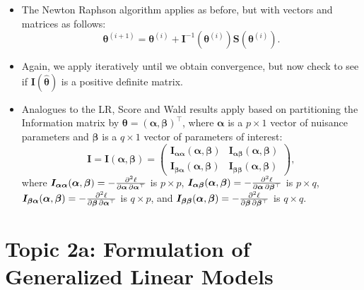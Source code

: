 \documentclass{article}\usepackage[]{graphicx}\usepackage[svgnames]{xcolor}
\providecommand{\Vector}[1]{\bm{#1}}%
\providecommand{\Matrix}[1]{\bm{#1}}
\begin{document}
\begin{itemize}
      \item The Newton Raphson algorithm applies as before, but with vectors and matrices
            as follows:
            \[ \Vector{\theta}^{(i+1)}=\Vector{\theta}^{(i)}+\Matrix{I}^{-1}(\Vector{\theta}^{(i)})\Vector{S}(\Vector{\theta}^{(i)}). \]
      \item Again, we apply iteratively until we obtain convergence, but now check to
            see if $ \Matrix{I}(\hat{\Vector{\theta}}) $ is a positive definite matrix.
      \item Analogues to the LR, Score and Wald results apply based on partitioning the
            Information matrix by $ \Vector{\theta}=(\Vector{\alpha},\Vector{\beta})^\top $,
            where $ \Vector{\alpha} $ is a $ p\times 1 $ vector of nuisance parameters and $ \Vector{\beta} $ is a $ q\times 1 $ vector of parameters of interest:
            \[ \Matrix{I}=\Matrix{I}(\Vector{\alpha},\Vector{\beta})=\begin{pmatrix}
                        \Matrix{I}_{\Vector{\alpha}\Vector{\alpha}}(\Vector{\alpha},\Vector{\beta}) & \Matrix{I}_{\Vector{\alpha}\Vector{\beta}}(\Vector{\alpha},\Vector{\beta}) \\
                        \Matrix{I}_{\Vector{\beta}\Vector{\alpha}}(\Vector{\alpha},\Vector{\beta})  & \Matrix{I}_{\Vector{\beta}\Vector{\beta}}(\Vector{\alpha},\Vector{\beta})
                  \end{pmatrix}, \]
            where
            $ \Matrix{I}_{\Vector{\alpha}\Vector{\alpha}}(\Vector{\alpha},\Vector{\beta})=-\pdv{\ell}{\Vector{\alpha},\Vector{\alpha}^\top} $ is $ p\times p $,
            $ \Matrix{I}_{\Vector{\alpha}\Vector{\beta}}(\Vector{\alpha},\Vector{\beta})=-\pdv{\ell}{\Vector{\alpha},\Vector{\beta}^\top} $ is $ p\times q $,
            $ \Matrix{I}_{\Vector{\beta}\Vector{\alpha}}(\Vector{\alpha},\Vector{\beta})=-\pdv{\ell}{\Vector{\beta},\Vector{\alpha}^\top} $ is $ q\times p $, and
            $ \Matrix{I}_{\Vector{\beta}\Vector{\beta}}(\Vector{\alpha},\Vector{\beta})=-\pdv{\ell}{\Vector{\beta},\Vector{\beta}^\top} $ is $ q\times q $.
\end{itemize}

\section*{Topic 2a: Formulation of Generalized Linear Models}
\end{document}
